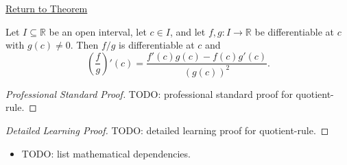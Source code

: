 \newpage
{}
\label{prf:quotient-rule}

\begin{remark*}[Return]
\hyperref[thm:quotient-rule]{Return to Theorem}
\end{remark*}

\begin{theorem*}
Let $I \subseteq \mathbb{R}$ be an open interval, let $c \in I$, and let
$f, g : I \to \mathbb{R}$ be differentiable at $c$ with $g(c) \neq 0$. Then
$f/g$ is differentiable at $c$ and
\[
  \left(\frac{f}{g}\right)'(c) = \frac{f'(c)g(c) - f(c)g'(c)}{(g(c))^2}.
\]
\end{theorem*}

\begin{proof}[Professional Standard Proof]
\LRAProofBodyStart
TODO: professional standard proof for quotient-rule.
\end{proof}

\begin{proof}[Detailed Learning Proof]
\LRAProofBodyStart
TODO: detailed learning proof for quotient-rule.
\end{proof}

\begin{remark*}
\end{remark*}

\begin{dependencies}
\begin{itemize}
  \item TODO: list mathematical dependencies.
\end{itemize}
\end{dependencies}

\clearpage
